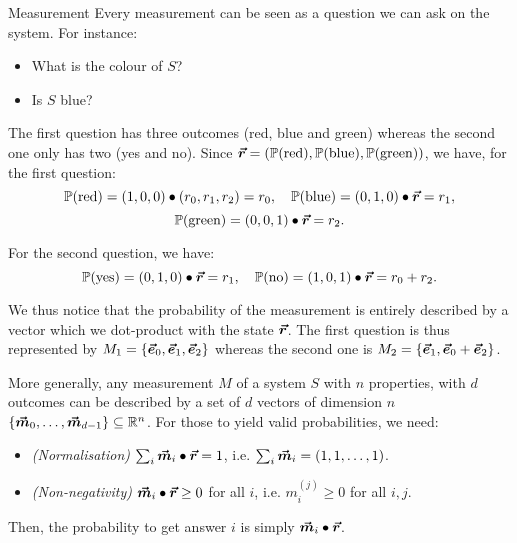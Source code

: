 \documentclass[a4paper]{article}
\begin{document}
\begin{parag}{Measurement}
    Every measurement can be seen as a question we can ask on the system. For instance:
    \begin{itemize}
        \item What is the colour of $S$? 
        \item Is $S$ blue?
    \end{itemize}

    The first question has three outcomes (red, blue and green) whereas the second one only has two (yes and no). Since $\bvec{r} = \left(\prob\left(\text{red}\right), \prob\left(\text{blue}\right), \prob\left(\text{green}\right)\right)$, we have, for the first question: 
    \[\prob\left(\text{red}\right) = \left(1, 0, 0\right) \dotprod \left(r_0, r_1, r_2\right) = r_0, \mathspace \prob\left(\text{blue}\right) = \left(0, 1, 0\right) \dotprod \bvec{r} = r_1,\]
    \[ \prob\left(\text{green}\right) = \left(0, 0, 1\right) \dotprod \bvec{r} = r_2.\]
    
    For the second question, we have: 
    \[\prob\left(\text{yes}\right) = \left(0, 1, 0\right) \dotprod \bvec{r} = r_1, \mathspace \prob\left(\text{no}\right) = \left(1, 0, 1\right) \dotprod \bvec{r} = r_0 + r_2.\]
    
    We thus notice that the probability of the measurement is entirely described by a vector which we dot-product with the state $\bm{\protect\vec{r}}$. The first question is thus represented by $M_1 = \left\{\bvec{e}_0, \bvec{e}_1, \bvec{e}_2\right\}$ whereas the second one is $M_2 = \left\{\bvec{e}_1, \bvec{e}_0 + \bvec{e}_2\right\}$. 

    More generally, any measurement $M$ of a system $S$ with $n$ properties, with $d$ outcomes can be described by a set of $d$ vectors of dimension $n$ $\left\{\bvec{m}_0, \ldots, \bvec{m}_{d-1}\right\} \subseteq \mathbb{R}^{n}$. For those to yield valid probabilities, we need:
    \begin{itemize}
        \item \textit{(Normalisation)} $\sum_{i} \bm{\protect\vec{m}}_i \bullet \bm{\protect\vec{r}} = 1$, i.e. $\sum_{i} \bvec{m}_i = \left(1, 1, \ldots, 1\right)$.
        \item \textit{(Non-negativity)} $\bm{\protect\vec{m}}_i \bullet \bm{\protect\vec{r}} \geq 0$ for all $i$, i.e. $m_i^{\left(j\right)} \geq 0$ for all $i, j$.
    \end{itemize}

    Then, the probability to get answer $i$ is simply $\bm{\protect\vec{m}}_i \bullet \bm{\protect\vec{r}}$.
\end{parag}
\end{document}
